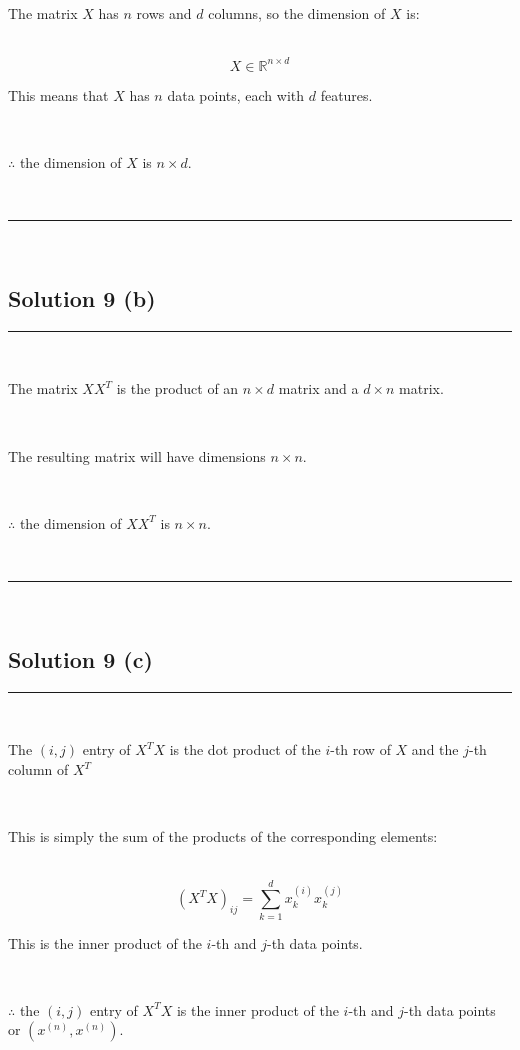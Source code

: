 \documentclass{article}
\begin{document}
\parbox{\textwidth}{The matrix $X$ has $n$ rows and $d$ columns, so the dimension of $X$ is:}\\

$$X \in \mathbb{R}^{n \times d}$$

\parbox{\textwidth}{This means that $X$ has $n$ data points, each with $d$ features.}\\

\parbox{\textwidth}{$\therefore$ the dimension of $X$ is $n \times d$.}\\

\noindent\rule{\textwidth}{0.4pt}\\

\newpage
\subsection*{Solution 9 (b)}
\noindent\rule{\textwidth}{0.4pt}\\

\parbox{\textwidth}{The matrix ${XX}^T$ is the product of an $n \times d$ matrix and a $d \times n$ matrix.}\\

\parbox{\textwidth}{The resulting matrix will have dimensions $n \times n$.}\\

\parbox{\textwidth}{$\therefore$ the dimension of ${XX}^T$ is $n \times n$.}\\

\noindent\rule{\textwidth}{0.4pt}\\

\newpage
\subsection*{Solution 9 (c)}
\noindent\rule{\textwidth}{0.4pt}\\

\parbox{\textwidth}{The $(i,j)$ entry of ${X}^TX$ is the dot product of the $i$-th row of $X$ and the $j$-th column of $X^T$ }\\

\parbox{\textwidth}{This is simply the sum of the products of the corresponding elements:}\\

$$(X^TX)_{ij} = \sum_{k=1}^{d} x^{(i)}_k x^{(j)}_k$$

\parbox{\textwidth}{This is the inner product of the $i$-th and $j$-th data points.}\\

\parbox{\textwidth}{$\therefore$ the $(i,j)$ entry of ${X}^TX$ is the inner product of the $i$-th and $j$-th data points or $(x^{(n)},x^{(n)})$.}\\
\end{document}
